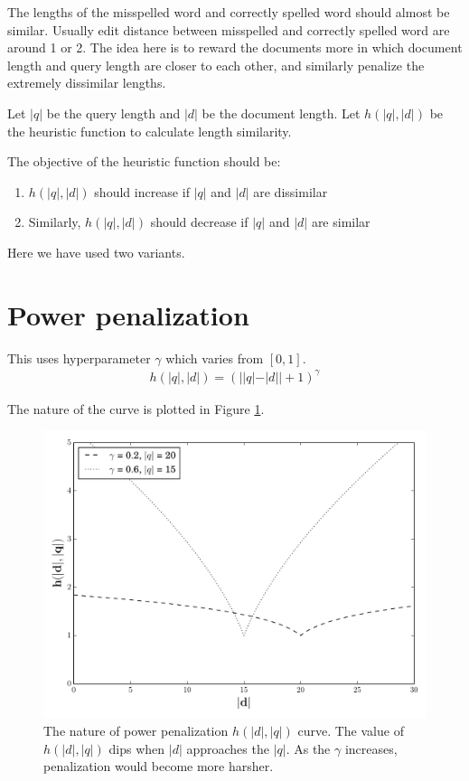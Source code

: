 The lengths of the misspelled word and correctly spelled word should almost be similar. 
Usually edit distance between misspelled and correctly spelled word are around 1 or 2.
The idea here is to reward the documents more in which document length and query length are closer to each other, and similarly penalize the extremely dissimilar lengths.

Let $|q|$ be the query length and $|d|$ be the document length. Let $h(|q|, |d|)$ be the heuristic function to calculate length similarity. 

The objective of the heuristic function should be:
\begin{enumerate}
	\item $h(|q|, |d|)$ should increase if $|q|$ and $|d|$ are dissimilar
	\item Similarly, $h(|q|, |d|)$ should decrease if $|q|$ and $|d|$ are similar
\end{enumerate}

Here we have used two variants.

\section{Power penalization} This uses hyperparameter $\gamma$ which varies from $[0, 1]$.
\begin{equation}
	\begin{aligned}
		h(|q|, |d|) = (||q| - |d|| + 1)^\gamma
	\end{aligned}
\end{equation}

The nature of the curve is plotted in Figure \ref{natures}.
\begin{figure}[h]
	\centering
	\includegraphics[width=\textwidth]{gfx/test1.pdf}
	\caption{The nature of power penalization $h(|d|, |q|)$ curve. The value of $h(|d|, |q|)$ dips when $|d|$ approaches the $|q|$. As the $\gamma$ increases, penalization would become more harsher.}
	\label{natures}
\end{figure}

